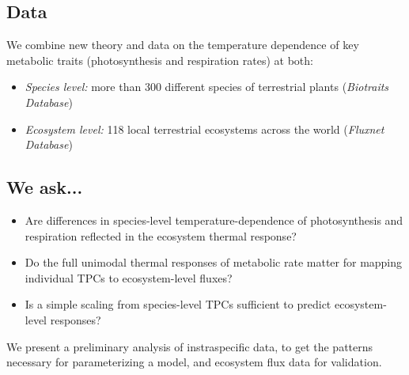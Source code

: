\documentclass[25pt,margin=18mm, innermargin=12mm]{tikzposter}
\begin{document}
{\begin{minipage}[]{0.52\linewidth}
   \vspace{-10pt}
   \subsection*{Data}

    We combine new theory and data on the temperature dependence of key metabolic traits (photosynthesis and respiration rates) at both:
    \begin{itemize} \itemsep5pt 
    \item \textit {Species level:} more than 300 different species of terrestrial plants (\textit {Biotraits Database})
    \item \textit{Ecosystem level:} 118 local terrestrial ecosystems across the world (\textit{Fluxnet Database})
    \end {itemize}

    \vspace{-10pt}
    \subsection*{We ask...}
  
    \begin{itemize} \itemsep5pt 
    \item Are differences in species-level temperature-dependence of photosynthesis and respiration reflected in the ecosystem thermal response? 
    \item Do the full unimodal thermal responses of metabolic rate matter for mapping individual TPCs to ecosystem-level fluxes?
    \item Is a simple scaling from species-level TPCs sufficient to predict ecosystem-level responses?
    \end{itemize}


        \vspace{10pt}
   We present a preliminary analysis of instraspecific data, to get the patterns necessary for parameterizing a model, and ecosystem flux data for validation.
    \end{minipage}
 }
\end{document}
